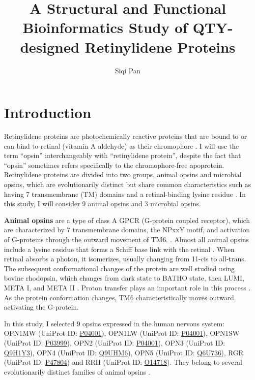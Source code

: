 \documentclass[fleqn, 10pt]{manuscript}
\title{A Structural and Functional Bioinformatics Study of QTY-designed Retinylidene Proteins}
\author[1]{Siqi Pan}
\affil[1]{Shanghai World Foreign Language Academy, 400 Baihua Street, Shanghai 200233, China}
\begin{document}
\flushbottom
\maketitle
\thispagestyle{empty}

\section*{Introduction}

Retinylidene proteins are photochemically reactive proteins that are bound to or can bind to retinal (vitamin A aldehyde) as their chromophore \citep{Spudich_2000}. I will use the term ``opsin'' interchangeably with ``retinylidene protein'', despite the fact that ``opsin'' sometimes refers specifically to the chromophore-free apoprotein. Retinylidene proteins are divided into two groups, animal opsins and microbial opsins, which are evolutionarily distinct but share common characteristics such as having 7 transmembrane (TM) domains and a retinal-binding lysine residue \citep{Yee_2013, Spudich_2000}. In this study, I will consider 9 animal opsins and 3 microbial opsins. 

\textbf{Animal opsins} are a type of class A GPCR (G-protein coupled receptor), which are characterized by 7 transmembrane domains, the NPxxY motif, and activation of G-proteins through the outward movement of TM6. \citep{Zhou_2019}. Almost all animal opsins include a lysine residue that forms a Schiff base link with the retinal \citep{Guhmann_2022}. When retinal absorbs a photon, it isomerizes, usually changing from 11-cis to all-trans. The subsequent conformational changes of the protein are well studied using bovine rhodopsin, which changes from dark state to BATHO state, then LUMI, META I, and META II \citep{Okada_2001}. Proton transfer plays an important role in this process \citep{Mahalingam_2008}. As the protein conformation changes, TM6 characteristically moves outward, activating the G-protein. 

In this study, I selected 9 opsins expressed in the human nervous system: OPN1MW (UniProt ID: \href{https://www.uniprot.org/uniprotkb/P04001/entry}{P04001}), OPN1LW (UniProt ID: \href{https://www.uniprot.org/uniprotkb/P04000/entry}{P04001}), OPN1SW (UniProt ID: \href{https://www.uniprot.org/uniprotkb/P03999/entry}{P03999}), OPN2 (UniProt ID: \href{https://www.uniprot.org/uniprotkb/P08100/entry}{P04001}), OPN3 (UniProt ID: \href{https://www.uniprot.org/uniprotkb/Q9H1Y3/entry}{Q9H1Y3}), OPN4 (UniProt ID: \href{https://www.uniprot.org/uniprotkb/Q9UHM6/entry}{Q9UHM6}), OPN5 (UniProt ID: \href{https://www.uniprot.org/uniprotkb/Q6U736/entry}{Q6U736}), RGR (UniProt ID: \href{https://www.uniprot.org/uniprotkb/P47804/entry}{P47804}) and RRH (UniProt ID: \href{https://www.uniprot.org/uniprotkb/O14718/entry}{O14718}). They belong to several evolutionarily distinct families of animal opsins \citep{Terakita_2005}. 
\end{document}

